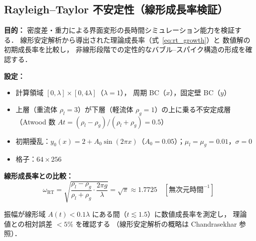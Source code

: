 \subsection{Rayleigh--Taylor 不安定性（線形成長率検証）}
\label{sec:val_rt}
\label{sec:bench_rt}

\textbf{目的：}
密度差・重力による界面変形の長時間シミュレーション能力を検証する．
線形安定解析から導出された理論成長率（式~\eqref{eq:rt_growth}）と
数値解の初期成長率を比較し，
非線形段階での定性的なバブル--スパイク構造の形成を確認する．

\textbf{設定：}
\begin{itemize}
  \item 計算領域 $[0, \lambda] \times [0, 4\lambda]$（$\lambda = 1$），
        周期 BC（$x$），固定壁 BC（$y$）
  \item 上層（重流体 $\rho_l = 3$）が下層（軽流体 $\rho_g = 1$）の上に乗る不安定成層
        （Atwood 数 $At = (\rho_l-\rho_g)/(\rho_l+\rho_g) = 0.5$）
  \item 初期擾乱：$y_0(x) = 2 + A_0\sin(2\pi x)$（$A_0 = 0.05$）；$\mu_l = \mu_g = 0.01$，$\sigma = 0$
  \item 格子：$64 \times 256$
\end{itemize}

\textbf{線形成長率との比較：}
\begin{equation}
  \omega_{\mathrm{RT}} = \sqrt{\frac{\rho_l - \rho_g}{\rho_l + \rho_g} \cdot \frac{2\pi g}{\lambda}}
  = \sqrt{\pi} \approx 1.7725
  \quad [\text{無次元時間}^{-1}]
  \label{eq:rt_growth}
\end{equation}

振幅が線形域 $A(t) < 0.1\lambda$ にある間（$t \lesssim 1.5$）に数値成長率を測定し，
理論値との相対誤差 $< 5\%$ を確認する
（線形安定解析の概略は Chandrasekhar \cite{Chandrasekhar1961} 参照）．
